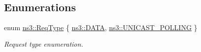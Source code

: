 \subsection*{Enumerations}
\begin{DoxyCompactItemize}
\item 
enum \hyperlink{namespacens3_a534f9a14e4d9aeb5b400e61f152a73a2}{ns3\+::\+Req\+Type} \{ \hyperlink{namespacens3_a534f9a14e4d9aeb5b400e61f152a73a2ae87e0f8f47d5619e16355b1f8caca558}{ns3\+::\+D\+A\+TA}, 
\hyperlink{namespacens3_a534f9a14e4d9aeb5b400e61f152a73a2ab774c9fb3410eec7ee3c8367c50ccbb3}{ns3\+::\+U\+N\+I\+C\+A\+S\+T\+\_\+\+P\+O\+L\+L\+I\+NG}
 \}\begin{DoxyCompactList}\small\item\em Request type enumeration. \end{DoxyCompactList}
\end{DoxyCompactItemize}
